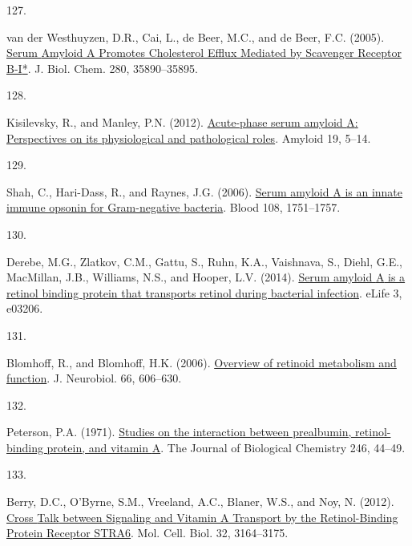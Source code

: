 \documentclass[
]{article}
\newlength{\cslhangindent}
\newlength{\csllabelwidth}
\newlength{\cslentryspacingunit} %
\newenvironment{CSLReferences}[2] %
 {%
  \setlength{\parindent}{0pt}
  \ifodd #1
  \let\oldpar\par
  \def\par{\hangindent=\cslhangindent\oldpar}
  \fi
  \setlength{\parskip}{#2\cslentryspacingunit}
 }%
 {}
\newcommand{\CSLLeftMargin}[1]{\parbox[t]{\csllabelwidth}{#1}}
\newcommand{\CSLRightInline}[1]{\parbox[t]{\linewidth - \csllabelwidth}{#1}\break}
\begin{document}
\begin{CSLReferences}{0}{0}
\leavevmode{}%
\CSLLeftMargin{127. }
\CSLRightInline{van der Westhuyzen, D.R., Cai, L., de Beer, M.C., and de Beer, F.C. (2005). \href{https://doi.org/10.1074/jbc.M505685200}{Serum {Amyloid A Promotes Cholesterol Efflux Mediated} by {Scavenger Receptor B-I}*}. J. Biol. Chem. 280, 35890--35895.}

\leavevmode{}%
\CSLLeftMargin{128. }
\CSLRightInline{Kisilevsky, R., and Manley, P.N. (2012). \href{https://doi.org/10.3109/13506129.2011.654294}{Acute-phase serum amyloid {A}: {Perspectives} on its physiological and pathological roles}. Amyloid 19, 5--14.}

\leavevmode{}%
\CSLLeftMargin{129. }
\CSLRightInline{Shah, C., Hari-Dass, R., and Raynes, J.G. (2006). \href{https://doi.org/10.1182/blood-2005-11-011932}{Serum amyloid {A} is an innate immune opsonin for {Gram-negative} bacteria}. Blood 108, 1751--1757.}

\leavevmode{}%
\CSLLeftMargin{130. }
\CSLRightInline{Derebe, M.G., Zlatkov, C.M., Gattu, S., Ruhn, K.A., Vaishnava, S., Diehl, G.E., MacMillan, J.B., Williams, N.S., and Hooper, L.V. (2014). \href{https://doi.org/10.7554/elife.03206}{Serum amyloid {A} is a retinol binding protein that transports retinol during bacterial infection}. eLife 3, e03206.}

\leavevmode{}%
\CSLLeftMargin{131. }
\CSLRightInline{Blomhoff, R., and Blomhoff, H.K. (2006). \href{https://doi.org/10.1002/neu.20242}{Overview of retinoid metabolism and function}. J. Neurobiol. 66, 606--630.}

\leavevmode{}%
\CSLLeftMargin{132. }
\CSLRightInline{Peterson, P.A. (1971). \href{https://www.ncbi.nlm.nih.gov/pubmed/5541771}{Studies on the interaction between prealbumin, retinol-binding protein, and vitamin {A}}. The Journal of Biological Chemistry 246, 44--49.}

\leavevmode{}%
\CSLLeftMargin{133. }
\CSLRightInline{Berry, D.C., O'Byrne, S.M., Vreeland, A.C., Blaner, W.S., and Noy, N. (2012). \href{https://doi.org/10.1128/MCB.00505-12}{Cross {Talk} between {Signaling} and {Vitamin A Transport} by the {Retinol-Binding Protein Receptor STRA6}}. Mol. Cell. Biol. 32, 3164--3175.}


\end{CSLReferences}
\end{document}
